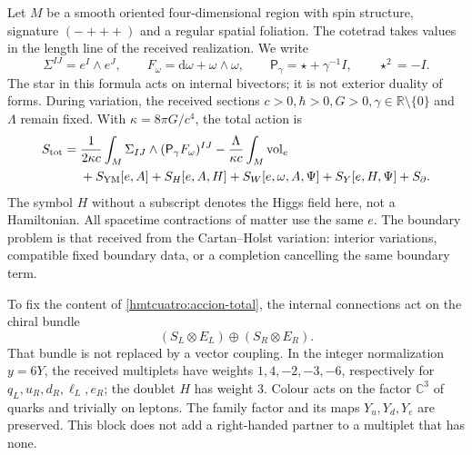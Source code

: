 Let \(M\) be a smooth oriented four-dimensional region with spin structure, signature \((-+++)\) and a regular spatial foliation. The cotetrad takes values in the length line of the received realization. We write
\[
 \Sigma^{IJ}=e^I\wedge e^J,\qquad
 F_\omega=\mathrm d\omega+\omega\wedge\omega,\qquad
 \mathsf P_\gamma=\star+\gamma^{-1}I,\qquad \star^2=-I.
\]
The star in this formula acts on internal bivectors; it is not exterior duality of forms. During variation, the received sections \(c>0,\hbar>0,G>0,\gamma\in\mathbb R\setminus\{0\}\) and \(\Lambda\) remain fixed. With \(\kappa=8\pi G/c^4\), the total action is
\begin{equation}
 \begin{split}
 S_{\rm tot}={}&\frac1{2\kappa c}
   \int_M\Sigma_{IJ}\wedge(\mathsf P_\gamma F_\omega)^{IJ}
 -\frac{\Lambda}{\kappa c}\int_M\operatorname{vol}_e\\
 &+S_{\rm YM}[e,A]+S_H[e,A,H]
   +S_W[e,\omega,A,\Psi]+S_Y[e,H,\Psi]+S_{\partial}.
 \end{split}
 \label{hmtcuatro:accion-total}
\end{equation}
The symbol \(H\) without a subscript denotes the Higgs field here, not a Hamiltonian. All spacetime contractions of matter use the same \(e\). The boundary problem is that received from the Cartan--Holst variation: interior variations, compatible fixed boundary data, or a completion cancelling the same boundary term.

To fix the content of \eqref{hmtcuatro:accion-total}, the internal connections act on the chiral bundle
\[
 (S_L\otimes E_L)\oplus(S_R\otimes E_R).
\]
That bundle is not replaced by a vector coupling. In the integer normalization \(y=6Y\), the received multiplets have weights \(1,4,-2,-3,-6\), respectively for \(q_L,u_R,d_R,\ell_L,e_R\); the doublet \(H\) has weight \(3\). Colour acts on the factor \(\mathbb C^3\) of quarks and trivially on leptons. The family factor and its maps \(Y_u,Y_d,Y_e\) are preserved. This block does not add a right-handed partner to a multiplet that has none.

